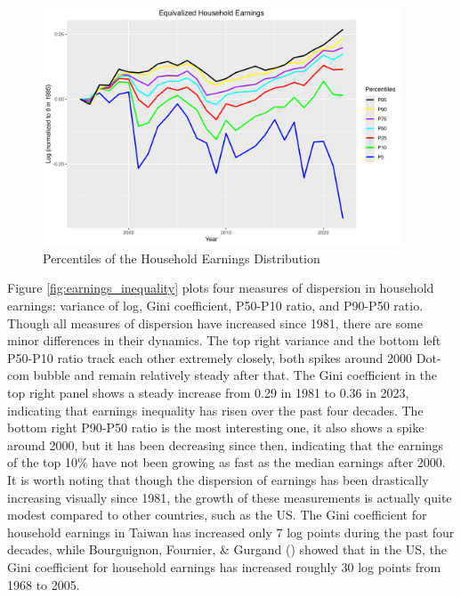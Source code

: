 \documentclass{article}
\begin{document}
\begin{figure}
    \centering
    \includegraphics[width=0.95\textwidth]{figures/Fig_2/Fig_2_percentiles_a1995.png}
    \caption{Percentiles of the Household Earnings Distribution}
    \label{fig:earnings_inequality_cyclic}
\end{figure}

Figure \ref{fig:earnings_inequality} plots four measures of dispersion in household earnings: variance of log, Gini coefficient, P50-P10 ratio, and P90-P50 ratio.
Though all measures of dispersion have increased since 1981, there are some minor differences in their dynamics.
The top right variance and the bottom left P50-P10 ratio track each other extremely closely, both spikes around 2000 Dot-com bubble and remain relatively steady after that.
The Gini coefficient in the top right panel shows a steady increase from 0.29 in 1981 to 0.36 in 2023, indicating that earnings inequality has risen over the past four decades.
The bottom right P90-P50 ratio is the most interesting one, it also shows a spike around 2000, but it has been decreasing since then, indicating that the earnings of the top 10\% have not been growing as fast as the median earnings after 2000.
It is worth noting that though the dispersion of earnings has been drastically increasing visually since 1981, the growth of these measurements is actually quite modest compared to other countries, such as the US.
The Gini coefficient for household earnings in Taiwan has increased only 7 log points during the past four decades, while Bourguignon, Fournier, \& Gurgand (\citeyear{TW_stable_dist}) showed that in the US, the Gini coefficient for household earnings has increased roughly 30 log points from 1968 to 2005.
\end{document}

